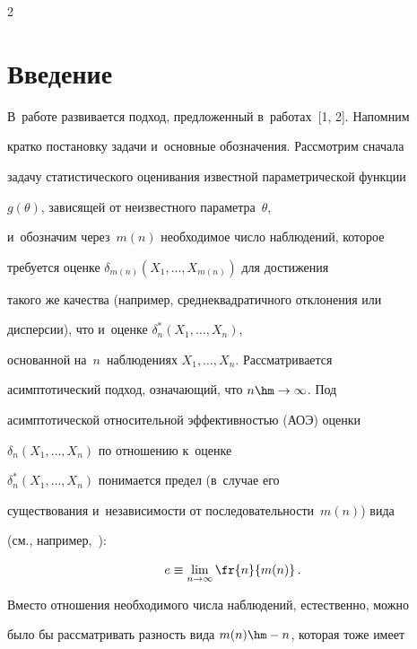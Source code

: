 \begin{multicols}{2}





\label{st\stat}





\section{Введение}





В~работе развивается подход, предложенный в~ра\-бо\-тах~[1, 2]. Напомним


кратко постановку задачи и~основные обозначения. Рассмотрим сначала


задачу статистического оценивания известной пара\-мет\-ри\-че\-ской функции


$g(\theta)$, зависящей от неизвестного параметра~$\theta$, 


и~обозначим через~$m(n)$ необходимое число наблюдений, которое


требуется оценке $\delta_{m(n)}(X_1,\ldots,X_{m(n)})$ для достижения


такого же качества (например, среднеквадратичного отклонения или


дисперсии), что и~оценке $\delta^*_{n}(X_1,\ldots,X_{n})$,


основанной на~$n$~наблюдениях $X_1,\ldots,X_n$. Рас\-смат\-ри\-ва\-ет\-ся


асимптотический подход, означающий, что $n \hm\to \infty$. Под


асимптотической относительной эффективностью (АОЭ) оценки


$\delta_n(X_1,\ldots,X_n)$ по отношению к~оценке


$\delta^*_{n}(X_1,\ldots,X_{n})$ понимается предел (в~случае его


существования и~не\-за\-ви\-си\-мости от по\-сле\-до\-ва\-тель\-ности~$m(n)$) вида


(см., например,~\cite[с.~305]{4-ben}):


$$


e \equiv \lim\limits_{n\to\infty} \fr{n}{m(n)}\,.


$$


Вместо отношения необходимого числа наблюдений, естественно, можно


было бы рассматривать разность вида $m(n) \hm- n$, которая тоже имеет



\end{multicols}
